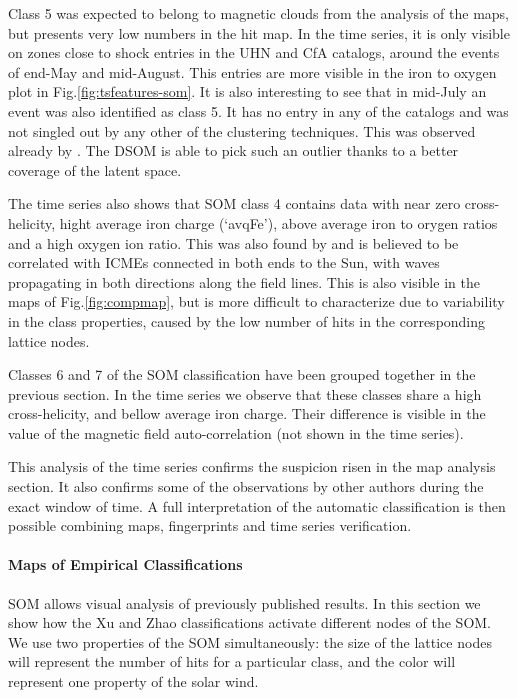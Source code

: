 Class 5 was expected to belong to magnetic clouds from the analysis of the maps, but presents very low numbers in the hit map. In the time series, it is only visible on zones close to shock entries in the UHN and CfA catalogs, around the events of end-May and mid-August. This entries are more visible in the iron to oxygen plot in Fig.\ref{fig:tsfeatures-som}. It is also interesting to see that in mid-July an event was also identified as class 5. It has no entry in any of the catalogs and was not singled out by any other of the clustering techniques. This was observed already by \citep{Roberts2020}. The DSOM is able to pick such an outlier thanks to a better coverage of the latent space.

The time series also shows that SOM class 4 contains data with near zero cross-helicity, hight average iron charge (`avqFe'), above average iron to orygen ratios and a high oxygen ion ratio. This was also found by \citep{Roberts2020} and is believed to be correlated with ICMEs connected in both ends to the Sun, with waves propagating in both directions along the field lines. This is also visible in the maps of Fig.\ref{fig:compmap}, but is more difficult to characterize due to variability in the class properties, caused by the low number of hits in the corresponding lattice nodes.

Classes 6 and 7 of the SOM classification have been grouped together in the previous section. In the time series we observe that these classes share a high cross-helicity, and bellow average iron charge. Their difference is visible in the value of the magnetic field auto-correlation (not shown in the time series).

This analysis of the time series confirms the suspicion risen in the map analysis section. It also confirms some of the observations by other authors during the exact window of time. A full interpretation of the automatic classification is then possible combining maps, fingerprints and time series verification.

\paragraph{Maps of Empirical Classifications}
SOM allows visual analysis of previously published results. In this section we show how the Xu and Zhao classifications activate different nodes of the SOM. We use two properties of the SOM simultaneously: the size of the lattice nodes will represent the number of hits for a particular class, and the color will represent one property of the solar wind.

